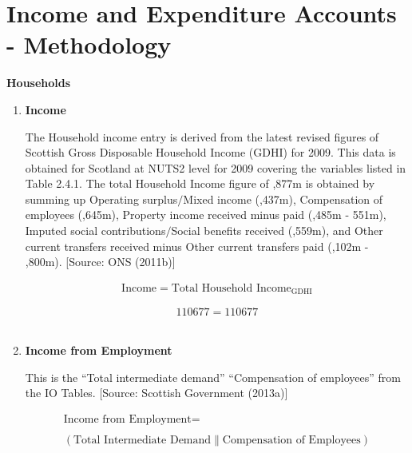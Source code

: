\pagebreak


\newpage
\section{Income and Expenditure Accounts - Methodology}
\label{sec:2.5}

\bigskip
\begin{center}
\textbf{\LARGE Households}
\end{center}

\begin{enumerate}



\item \textbf {Income}

The Household income entry is derived from the latest revised figures of Scottish Gross Disposable Household Income (GDHI) for 2009. This data is obtained for Scotland at NUTS2 level for 2009 covering the variables listed in Table 2.4.1. The total Household Income figure of ,877m is obtained by summing up Operating surplus$/$Mixed income (,437m), Compensation of employees (,645m), Property income received minus paid (,485m - \textsterling551m), Imputed social contributions$/$Social benefits received (,559m), and Other current transfers received minus Other current transfers paid (,102m - ,800m). [Source: ONS (2011b)] 


\begin{equation}
\begin{split}
\text{Income} =
\text{Total Household Income}_\text{GDHI}
\end{split} \label{eq:2.5.1}
\end{equation}

\begin{equation} \nonumber
110677 = 110677
\end{equation}\\

\item \textbf {Income from Employment}

This is the ``Total intermediate demand'' \text{|| }``Compensation of employees'' from the IO Tables. [Source: Scottish Government (2013a)]

\begin{equation}
\begin{split}
\text{Income from Employment} =  \\ \\
(\text{Total Intermediate Demand}\|\text{Compensation of Employees})
\end{split} \label{eq:2.5.2}
\end{equation}


\end{enumerate}
